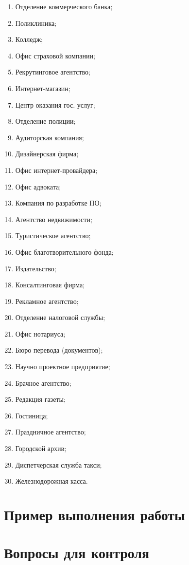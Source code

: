 \begin{minipage}{0.45\textwidth}
  \begin{enumerate}
    \item Отделение коммерческого банка;
    \item Поликлиника;
    \item Колледж;
    \item Офис страховой компании;
    \item Рекрутинговое агентство;
    \item Интернет-магазин;
    \item Центр оказания гос. услуг;
    \item Отделение полиции;
    \item Аудиторская компания;
    \item Дизайнерская фирма;
    \item Офис интернет-провайдера;
    \item Офис адвоката;
    \item Компания по разработке ПО;
    \item Агентство недвижимости;
    \item Туристическое агентство;
  \end{enumerate}
\end{minipage}
\hfill
\begin{minipage}{0.45\textwidth}
  \begin{enumerate}
    \setcounter{enumi}{15}
    \item Офис благотворительного фонда;
    \item Издательство;
    \item Консалтинговая фирма;
    \item Рекламное агентство;
    \item Отделение налоговой службы;
    \item Офис нотариуса;
    \item Бюро перевода (документов);
    \item Научно проектное предприятие;
    \item Брачное агентство;
    \item Редакция газеты;
    \item Гостиница;
    \item Праздничное агентство;
    \item Городской архив;
    \item Диспетчерская служба такси;
    \item Железнодорожная касса.
  \end{enumerate}
\end{minipage}

\section{Пример выполнения работы}\label{sect3_c}


\section{Вопросы для контроля}\label{sect3_e}
%
